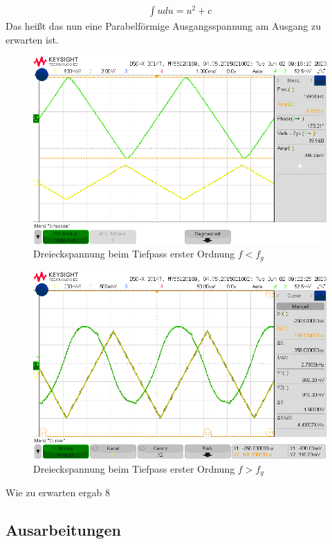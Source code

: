 \begin{align}
    \int{u du} = u^2 + c
\end{align}
Das heißt das nun eine Parabelförmige Ausgangsspannung am Ausgang zu erwarten ist.

\begin{figure}[H]
    \centering
    \includegraphics[width=\textwidth]{Lab_2/Messungen/TP_first_order/scope_30.png}
    \caption{Dreieckspannung beim Tiefpass erster Ordnung $f < f_g$}
    \label{fig:Dreieck_Tiefpass_erster_Ordnung_small_f}
\end{figure}
\begin{figure}[H]
    \centering
    \includegraphics[width=\textwidth]{Lab_2/Messungen/TP_first_order/scope_34.png}
    \caption{Dreieckspannung beim Tiefpass erster Ordnung $f > f_g$}
    \label{fig:Dreieck_Tiefpass_erster_Ordnung_big_f}
\end{figure}
Wie zu erwarten ergab 8
\subsection{Ausarbeitungen}

